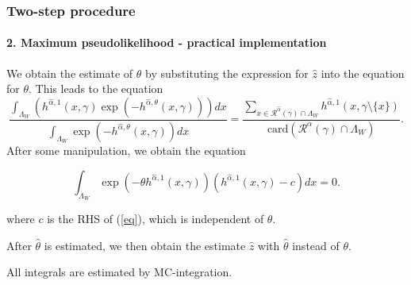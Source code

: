 \documentclass[c, 10pt]{beamer}
\begin{document}
\begin{frame}\frametitle{Two-step procedure}\framesubtitle{2. Maximum pseudolikelihood - practical implementation}
\begin{small}
We obtain the estimate of $\theta$ by substituting the expression for $\hat z$ into the equation for $\theta$. 
This leads to the equation
\begin{equation}\label{eq}
\frac{\int_{\Lambda_W } (h^{\hat\alpha,1}(x,\gamma)\exp{\left(-h^{\hat\alpha,\theta}(x,\gamma)\right)}) dx} {  \int_{\Lambda_W } \exp{\left( -h^{\hat\alpha,\theta}(x,\gamma)\right)} dx} 
= \frac {\sum_{x \in \mathcal R^{\hat\alpha}(\gamma)\cap \Lambda_W } h^{\hat\alpha,1}(x,\gamma\setminus\{x\})} { \mbox{card}(\mathcal R^\alpha(\gamma)\cap \Lambda_W ) }. 
\end{equation}
After some manipulation, we obtain the equation

$$\int_{\Lambda_W} \exp{\left(-\theta h^{\hat\alpha, 1}(x,\gamma)\right)} (h^{\hat\alpha, 1}(x,\gamma) - c) dx = 0 .$$

where $c$ is the RHS of (\ref{eq}), which is independent of $\theta$.

After $\hat\theta$ is estimated, we then obtain the estimate $\hat z$ with $\hat\theta$ instead of $\theta$.

All integrals are estimated by MC-integration.
\end{small}
\end{frame}


\end{document}
